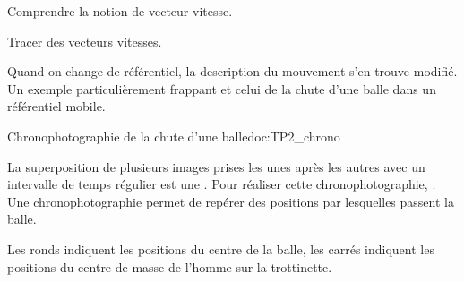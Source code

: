 \teteSndMouv

\nomPrenomClasse

\vspace*{-12pt}

\begin{objectifs}
  \item Comprendre la notion de vecteur vitesse.
  \item Tracer des vecteurs vitesses.
\end{objectifs}

\begin{contexte}
  Quand on change de référentiel, la description du mouvement s'en trouve modifié.
  Un exemple particulièrement frappant et celui de la chute d'une balle dans un référentiel mobile.
\end{contexte}




\begin{doc}{Chronophotographie de la chute d'une balle}{doc:TP2_chrono}
  \begin{center}
  \end{center}
  La superposition de plusieurs images prises les unes après les autres avec un intervalle de temps régulier est une .
  Pour réaliser cette chronophotographie, .
  Une chronophotographie permet de repérer des positions par lesquelles passent la balle.
  
  Les ronds indiquent les positions du centre de la balle, les carrés indiquent les positions du centre de masse de l'homme sur la trottinette.
\end{doc}

